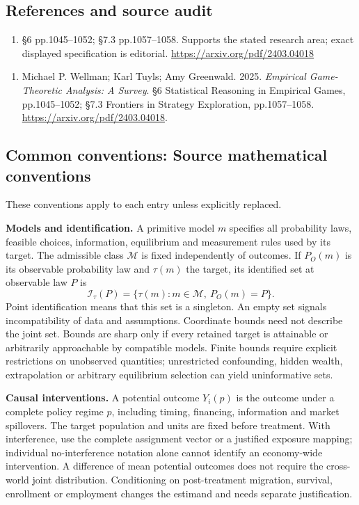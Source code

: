 \documentclass[11pt,a4paper]{article}
\begin{document}
\subsection*{References and source audit}
\begin{enumerate}
\item §6 pp.1045–1052; §7.3 pp.1057–1058. Supports the stated research area; exact displayed specification is editorial. \url{https://arxiv.org/pdf/2403.04018}
\end{enumerate}
\begin{enumerate}\raggedright
\item\hypertarget{definitions:source:30007570:1}{} Michael P. Wellman; Karl Tuyls; Amy Greenwald. 2025. \emph{Empirical Game-Theoretic Analysis: A Survey}. §6 Statistical Reasoning in Empirical Games, pp.1045–1052; §7.3 Frontiers in Strategy Exploration, pp.1057–1058.
\url{https://arxiv.org/pdf/2403.04018}.
\end{enumerate}

\subsection*{Common conventions: Source mathematical conventions}

These conventions apply to each entry unless explicitly replaced.

\textbf{Models and identification.} A primitive model \(m\) specifies all probability laws, feasible choices, information, equilibrium and measurement rules used by its target. The admissible class \(\mathcal M\) is fixed independently of outcomes. If \(P_O(m)\) is its observable probability law and \(\tau(m)\) the target, its identified set at observable law \(P\) is
\[
 \mathcal I_\tau(P)=\{\tau(m):m\in\mathcal M,\ P_O(m)=P\}.
\]
Point identification means that this set is a singleton. An empty set signals incompatibility of data and assumptions. Coordinate bounds need not describe the joint set. Bounds are sharp only if every retained target is attainable or arbitrarily approachable by compatible models. Finite bounds require explicit restrictions on unobserved quantities; unrestricted confounding, hidden wealth, extrapolation or arbitrary equilibrium selection can yield uninformative sets.

\textbf{Causal interventions.} A potential outcome \(Y_i(p)\) is the outcome under a complete policy regime \(p\), including timing, financing, information and market spillovers. The target population and units are fixed before treatment. With interference, use the complete assignment vector or a justified exposure mapping; individual no-interference notation alone cannot identify an economy-wide intervention. A difference of mean potential outcomes does not require the cross-world joint distribution. Conditioning on post-treatment migration, survival, enrollment or employment changes the estimand and needs separate justification.
\end{document}

